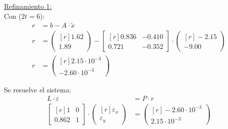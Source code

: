 \documentclass[../main.tex]{subfiles}
\begin{document}
\begin{example}
\begin{enumerate}
                    \underline{Refinamiento 1:}\\
                    Con ($2t = 6$):
                    \begin{equation}
                        \begin{split}
                            r &= b - A \cdot \widetilde{x} \\   
                            r &= \begin{pmatrix*}[r]
                                1.62\\
                                1.89
                            \end{pmatrix*} - 
                            \begin{bmatrix*}[r]
                                0.836 & -0.410\\
                                0.721 & -0.352
                            \end{bmatrix*} \cdot
                            \begin{pmatrix*}[r]
                                -2.15\\
                                -9.00
                            \end{pmatrix*} \\
                            r &= \begin{pmatrix*}[r]
                                2.15 \cdot 10^{-3}\\
                                -2.60 \cdot 10^{-3}
                            \end{pmatrix*}
                        \end{split}
                    \end{equation}

                    Se resuelve el sistema:
                    \begin{equation}
                        \begin{split}
                            L \cdot \varepsilon &= P \cdot r \\
                            \begin{bmatrix*}[r]
                                1 & 0\\
                                0.862 & 1
                            \end{bmatrix*} \cdot
                            \begin{pmatrix*}[r]
                                \varepsilon_x\\
                                \varepsilon_y
                            \end{pmatrix*} &=
                            \begin{pmatrix*}[r]
                                -2.60 \cdot 10^{-3} \\
                                2.15 \cdot 10^{-3}
                            \end{pmatrix*}
                        \end{split}
                    \end{equation}
                    

\end{enumerate}
\end{example}
\end{document}
